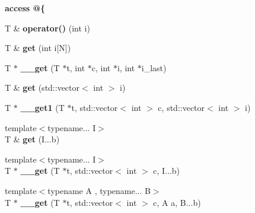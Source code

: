 \begin{Indent}{\bf access @\{}\par
\begin{DoxyCompactItemize}
\item 
\hypertarget{class____array_a2640e620004e448f2c9d70e2d048c91e}{T \& {\bfseries operator()} (int i)}\label{class____array_a2640e620004e448f2c9d70e2d048c91e}

\item 
\hypertarget{class____array_ab8aa25dbb4bf56dd2df5dca22112deaf}{T \& {\bfseries get} (int i\mbox{[}N\mbox{]})}\label{class____array_ab8aa25dbb4bf56dd2df5dca22112deaf}

\item 
\hypertarget{class____array_a048dc1381c0a2e3b8b07d487b6e429b1}{T $\ast$ {\bfseries \-\_\-\-\_\-get} (T $\ast$t, int $\ast$c, int $\ast$i, int $\ast$i\-\_\-last)}\label{class____array_a048dc1381c0a2e3b8b07d487b6e429b1}

\item 
\hypertarget{class____array_ac7d5ddda5112a815aef1b8ac55fb3d87}{T \& {\bfseries get} (std\-::vector$<$ int $>$ i)}\label{class____array_ac7d5ddda5112a815aef1b8ac55fb3d87}

\item 
\hypertarget{class____array_a848bc4f4f32da2e95eecd3dd0e375a30}{T $\ast$ {\bfseries \-\_\-\-\_\-get1} (T $\ast$t, std\-::vector$<$ int $>$ c, std\-::vector$<$ int $>$ i)}\label{class____array_a848bc4f4f32da2e95eecd3dd0e375a30}

\item 
\hypertarget{class____array_a718b8009c814b7cfac99e4b36178cc87}{{\footnotesize template$<$typename... I$>$ }\\T \& {\bfseries get} (I...\-b)}\label{class____array_a718b8009c814b7cfac99e4b36178cc87}

\item 
\hypertarget{class____array_a90e1d2986c4dd2ce4368de7b35e7e041}{{\footnotesize template$<$typename... I$>$ }\\T $\ast$ {\bfseries \-\_\-\-\_\-get} (T $\ast$t, std\-::vector$<$ int $>$ c, I...\-b)}\label{class____array_a90e1d2986c4dd2ce4368de7b35e7e041}

\item 
\hypertarget{class____array_a9592a69b889f834b844232459d89edc9}{{\footnotesize template$<$typename A , typename... B$>$ }\\T $\ast$ {\bfseries \-\_\-\-\_\-get} (T $\ast$t, std\-::vector$<$ int $>$ c, A a, B...\-b)}\label{class____array_a9592a69b889f834b844232459d89edc9}

\end{DoxyCompactItemize}
\end{Indent}
